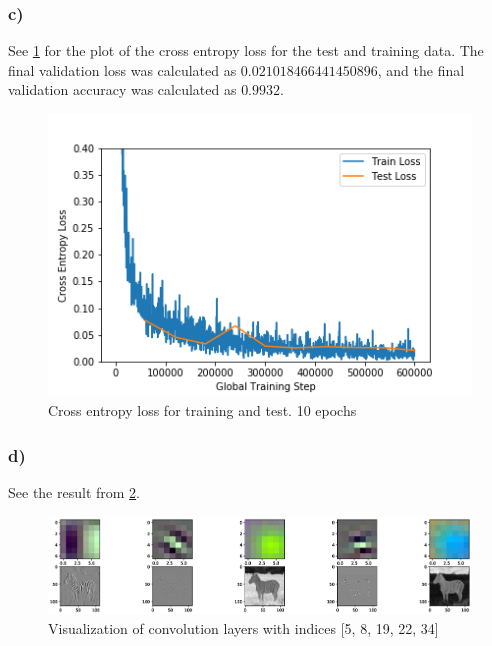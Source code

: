 
\subsubsection*{c)}
See \cref{fig:task2c} for the plot of the cross entropy loss for the test and training data. The final validation loss was calculated as $0.021018466441450896$, and the final validation accuracy was calculated as $0.9932$. 

\begin{figure}[]
    \centering
    \includegraphics[width=1.00\textwidth]{figures/image_processed/task2_c.png}
    \caption{Cross entropy loss for training and test. 10 epochs}
    \label{fig:task2c}
\end{figure}


\subsubsection*{d)}
See the result from \cref{fig:task2d}. 

\begin{figure}[]
    \centering
    \includegraphics[width=1.00\textwidth]{figures/task2d_image.eps}
    \caption{Visualization of convolution layers with indices [5, 8, 19, 22, 34]}
    \label{fig:task2d}
\end{figure}

